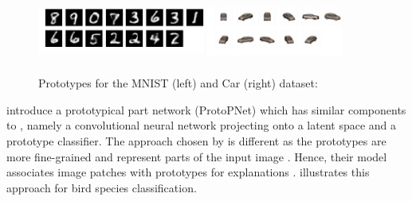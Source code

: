 \begin{figure}[t]
    \centering
    \includegraphics[width=0.49\textwidth, height=2cm]{Figures/Chapter3/prototype_result-1499.png}
    \includegraphics[width=0.4\textwidth, height=2cm]{Figures/Chapter3/car_both_R1_and_R2_new.png}
    \caption[Prototypes for the MNIST and Car dataset]{Prototypes for the MNIST (left) and Car (right) dataset: \citep{LiLCR18}}
    \label{fig:prototypes}
\end{figure}

\citet{ChenLTBRS19} introduce a prototypical part network (ProtoPNet) which has similar components to \citet{LiLCR18}, namely a convolutional neural network projecting onto a latent space and a prototype classifier. The approach chosen by \citet{ChenLTBRS19} is different as the prototypes are more fine-grained and represent parts of the input image \citep{xie2020explainable}. Hence, their model associates image patches with prototypes for explanations \citep{xie2020explainable}.  illustrates this approach for bird species classification.

